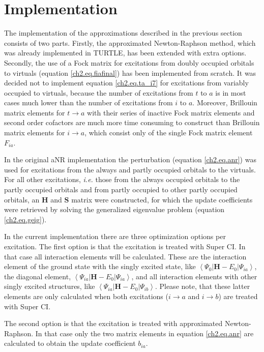 \section{\label{ch2.sec.implementation}Implementation}

The implementation of the approximations described in the previous section consists of two parts. Firstly, the approximated Newton-Raphson method, which was already implemented in TURTLE, has been extended with extra options. Secondly, the use of a Fock matrix for excitations from doubly occupied orbitals to virtuals (equation \ref{ch2.eq.fiafinal}) has been implemented from scratch. It was decided not to implement equation \ref{ch2.eq.ta_i7} for excitations from variably occupied to virtuals, because the number of excitations from $t$ to $a$ is in most cases much lower than the number of excitations from $i$ to $a$. Moreover, Brillouin matrix elements for $t \rightarrow a$ with their series of inactive Fock matrix elements and second order cofactors are much more time consuming to construct than Brillouin matrix elements for $i \rightarrow a$, which consist only of the single Fock matrix element $F_{ia}$.

In the original aNR implementation the perturbation (equation \ref{ch2.eq.anr}) was used for excitations from the always and partly occupied orbitals to the virtuals. For all other excitations, \textit{i.e.} those from the always occupied orbitals to the partly occupied orbitals and from partly occupied to other partly occupied orbitals, an $\mathbf{H}$ and $\mathbf{S}$ matrix were constructed, for which the update coefficients were retrieved by solving the generalized eigenvalue problem (equation \ref{ch2.eq.geig}). 

In the current implementation there are three optimization options per excitation. The first option is that the excitation is treated with Super CI. In that case all interaction elements will be calculated. These are the interaction element of the ground state with the singly excited state, like $\left < \Psi_{0} | \mathbf{H} - E_0 | \Psi_{ia} \right >$, the diagonal element, $\left < \Psi_{ia} | \mathbf{H} - E_0 | \Psi_{ia} \right >$, and all interaction elements with other singly excited structures, like $\left < \Psi_{ia} | \mathbf{H} - E_0 | \Psi_{ib} \right >$. Please note, that these latter elements are only calculated when both excitations ($i \rightarrow a$ and $i \rightarrow b$) are treated with Super CI.

The second option is that the excitation is treated with approximated Newton-Raphson. In that case only the two matrix elements in equation \ref{ch2.eq.anr} are calculated to obtain the update coefficient $b_{ia}$.

